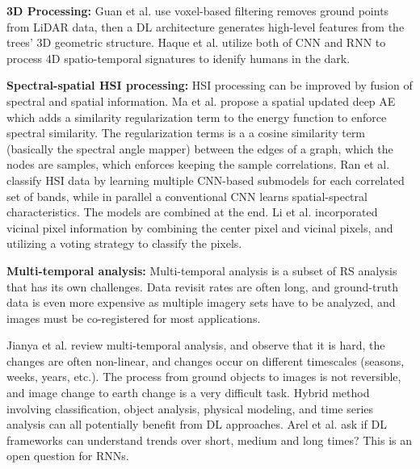 \documentclass[12pt]{spieman}
\begin{document}
\begin{spacing}{1}
%
%
\textbf{3D Processing:} Guan et al. \cite{Guan2015Deep} use voxel-based filtering removes ground points from LiDAR data, then a DL architecture generates high-level features from the trees’ 3D geometric structure. Haque et al. \cite{Haque2016} utilize both of CNN and RNN to process 4D spatio-temporal signatures to idenify humans in the dark.


%
%
\textbf{Spectral-spatial HSI processing:} HSI processing can be improved by fusion of spectral and spatial information. Ma et al. \cite{ma2016spectral} propose a spatial updated deep AE which adds a similarity regularization term to the energy function to enforce spectral similarity. The regularization terms is a a cosine similarity term (basically the spectral angle mapper) between the edges of a graph, which the nodes are samples, which enforces keeping the sample correlations. Ran et al. \cite{ran2016bands} classify HSI data by learning multiple  CNN-based submodels for each correlated set of bands, while in parallel a conventional CNN learns spatial-spectral characteristics. The models are combined at the end. Li et al. \cite{li2017hyperspectral} incorporated vicinal pixel information by combining the center pixel and vicinal pixels, and utilizing a voting strategy to classify the pixels. 

%
%
\textbf{Multi-temporal analysis:} Multi-temporal analysis is a subset of RS analysis that has its own challenges. Data revisit rates are often long, and ground-truth data is even more expensive as multiple imagery sets have to be analyzed, and images must be co-registered for most applications.

Jianya et al. \cite{jianya2008review} review multi-temporal analysis, and observe that it is hard, the changes are often non-linear, and changes occur on different timescales (seasons, weeks, years, etc.). The process from ground objects to images is not reversible, and image change to earth change is a very difficult task. Hybrid method involving classification, object analysis, physical modeling, and time series analysis can all potentially benefit from DL approaches. Arel et al. \cite{Arel2010} ask if DL frameworks can understand trends over short, medium and long times? This is an open question for RNNs.


\end{spacing}
\end{document}
